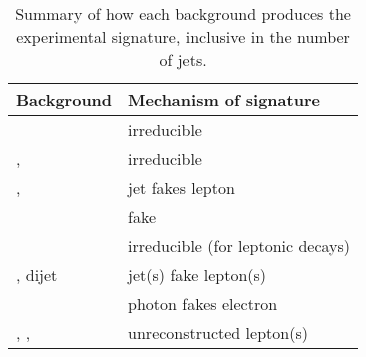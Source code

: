 \begin{table}[t]
	\begin{tabular}{l@{\hskip 0.3in}l}
		\toprule
		Background        & Mechanism of \HepProcess{\Plepton\Plepton + \met} signature \\
		\midrule
		\WW               & irreducible \\
		\ttbar, \HepProcess{\Ptop\PW} & irreducible \\
		\HepProcess{\Ptop\Pbottom}, \HepProcess{\Ptop\Pbottom\Pquark} & jet fakes lepton \\
		\DYll             & fake \met \\
		\DYtt             & irreducible (for leptonic \Ptau decays) \\
		\Wjets, dijet     & jet(s) fake lepton(s) \\
		\Wgamma           & photon fakes electron \\
		\WZ, \Wgstar, \ZZ & unreconstructed lepton(s) \\
		\bottomrule
	\end{tabular}
	\caption{Summary of how each background produces the 
	\HepProcess{\Plepton\Plepton + \met} experimental signature, inclusive in the number of 
	jets.}
	\label{tab:bkg_summary}
\end{table}
